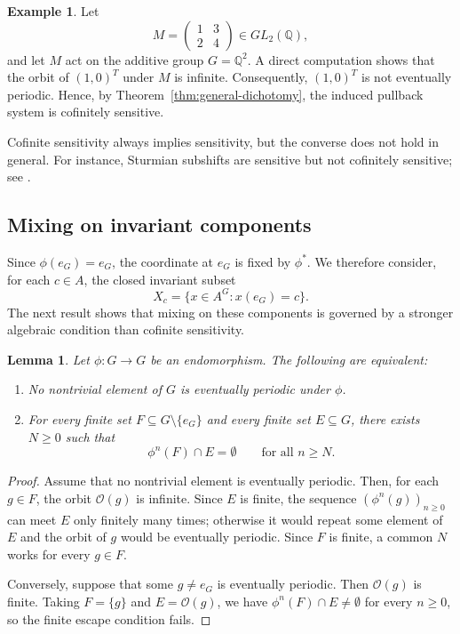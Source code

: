 \documentclass[12pt,a4paper]{article}
\newtheorem{lemma}[theorem]{Lemma}
\theoremstyle{definition}
\newtheorem{example}[theorem]{Example}
\theoremstyle{remark}
\newcommand{\Orb}{\mathcal{O}}
\begin{document}
\begin{example}\label{ex:matrix}
Let
\[
M=\begin{pmatrix}1&3\\2&4\end{pmatrix}\in GL_2(\mathbb{Q}),
\]
and let $M$ act on the additive group $G=\mathbb{Q}^2$. A direct computation shows that the orbit of $(1,0)^T$ under $M$ is infinite. Consequently, $(1,0)^T$ is not eventually periodic. Hence, by Theorem~\ref{thm:general-dichotomy}, the induced pullback system is cofinitely sensitive.
\end{example}

Cofinite sensitivity always implies sensitivity, but the converse does not hold in general. For instance, Sturmian subshifts are sensitive but not cofinitely sensitive; see \cite{Moothathu_2007}.

\subsection{Mixing on invariant components}\label{sec:Mixing on invariant components}

Since $\phi(e_G)=e_G$, the coordinate at $e_G$ is fixed by $\phi^*$. We therefore consider, for each $c\in A$, the closed invariant subset
\[
X_c=\{x\in A^G:x(e_G)=c\}.
\]
The next result shows that mixing on these components is governed by a stronger algebraic condition than cofinite sensitivity.

\begin{lemma}\label{lem:finite-escape}
Let $\phi:G\to G$ be an endomorphism. The following are equivalent:
\begin{enumerate}
\item No nontrivial element of $G$ is eventually periodic under $\phi$.
\item For every finite set $F\subseteq G\setminus\{e_G\}$ and every finite set $E\subseteq G$, there exists $N\geq 0$ such that
\[
\phi^n(F)\cap E=\emptyset
\qquad\text{for all }n\geq N.
\]
\end{enumerate}
\end{lemma}

\begin{proof}
Assume that no nontrivial element is eventually periodic. Then, for each $g\in F$, the orbit $\Orb(g)$ is infinite. Since $E$ is finite, the sequence $(\phi^n(g))_{n\geq 0}$ can meet $E$ only finitely many times; otherwise it would repeat some element of $E$ and the orbit of $g$ would be eventually periodic. Since $F$ is finite, a common $N$ works for every $g\in F$.

Conversely, suppose that some $g\neq e_G$ is eventually periodic. Then $\Orb(g)$ is finite. Taking $F=\{g\}$ and $E=\Orb(g)$, we have $\phi^n(F)\cap E\neq\emptyset$ for every $n\geq 0$, so the finite escape condition fails.
\end{proof}
\end{document}
